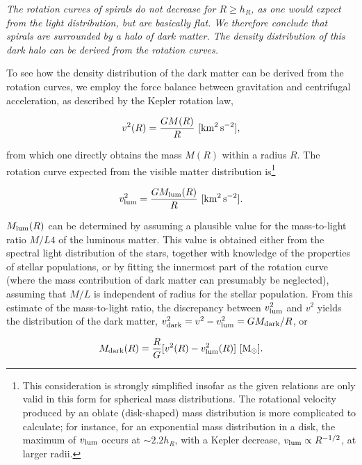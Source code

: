 \documentclass[a4paper,10pt]{article}
\begin{document}
{\noindent}\textit{The rotation curves of spirals do not decrease for $R\geq h_R$, as one would expect from the light distribution, but are basically flat. We therefore conclude that spirals are surrounded by a halo of dark matter. The density distribution of this dark halo can be derived from the rotation curves.}

{\noindent}To see how the density distribution of the dark matter can be derived from the rotation curves, we employ the force balance between gravitation and centrifugal acceleration, as described by the Kepler rotation law,

\begin{align*}
    v^2(R) = \frac{GM(R)}{R} ~ [{\rm km^2\,s^{-2}}],
\end{align*}

{\noindent}from which one directly obtains the mass $M(R)$ within a radius $R$. The rotation curve expected from the visible matter distribution is\footnote{This consideration is strongly simplified insofar as the given relations are only valid in this form for spherical mass distributions. The rotational velocity produced by an oblate (disk-shaped) mass distribution is more complicated to calculate; for instance, for an exponential mass distribution in a disk, the maximum of $v_{\rm lum}$ occurs at   $\sim2.2h_R$, with a Kepler decrease, $v_{\rm lum}\propto R^{-1/2}$, at larger radii.}

\begin{align*}
    v_{\rm lum}^2 = \frac{GM_{\rm lum}(R)}{R} ~ [{\rm km^2\,s^{-2}}].
\end{align*}

{\noindent}$M_{\rm lum}(R)$ can be determined by assuming a plausible value for the mass-to-light ratio $M/L4$ of the luminous matter. This value is obtained either from the spectral light distribution of the stars, together with knowledge of the properties of stellar populations, or by fitting the innermost part of the rotation curve (where the mass contribution of dark matter can presumably be neglected), assuming that $M/L$ is independent of radius for the stellar population. From this estimate of the mass-to-light ratio, the discrepancy between $v_{\rm lum}^2$ and $v^2$ yields the distribution of the dark matter, $v_{\rm dark}^2=v^2-v_{\rm lum}^2=GM_{\rm dark}/R$, or

\begin{align*}
    M_{\rm dark}(R) = \frac{R}{G} [v^2(R) - v_{\rm lum}^2(R)] ~ [{\rm M_\odot}].
\end{align*}
\end{document}
